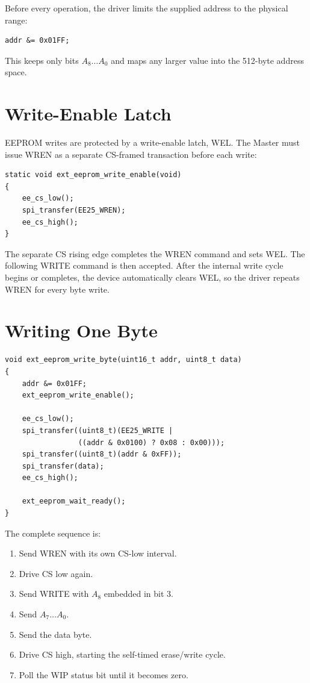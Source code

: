 \documentclass[11pt,a4paper]{article}
\begin{document}
Before every operation, the driver limits the supplied address to the physical range:
\begin{lstlisting}[style=cstyle]
addr &= 0x01FF;
\end{lstlisting}
This keeps only bits $A_8\ldots A_0$ and maps any larger value into the 512-byte address space.

\section{Write-Enable Latch}
EEPROM writes are protected by a write-enable latch, WEL. The Master must issue WREN as a separate CS-framed transaction before each write:

\begin{lstlisting}[style=cstyle]
static void ext_eeprom_write_enable(void)
{
    ee_cs_low();
    spi_transfer(EE25_WREN);
    ee_cs_high();
}
\end{lstlisting}

The separate CS rising edge completes the WREN command and sets WEL. The following WRITE command is then accepted. After the internal write cycle begins or completes, the device automatically clears WEL, so the driver repeats WREN for every byte write.

\section{Writing One Byte}

\begin{lstlisting}[style=cstyle,caption={Single-byte write sequence.}]
void ext_eeprom_write_byte(uint16_t addr, uint8_t data)
{
    addr &= 0x01FF;
    ext_eeprom_write_enable();

    ee_cs_low();
    spi_transfer((uint8_t)(EE25_WRITE |
                 ((addr & 0x0100) ? 0x08 : 0x00)));
    spi_transfer((uint8_t)(addr & 0xFF));
    spi_transfer(data);
    ee_cs_high();

    ext_eeprom_wait_ready();
}
\end{lstlisting}

The complete sequence is:
\begin{enumerate}
  \item Send WREN with its own CS-low interval.
  \item Drive CS low again.
  \item Send WRITE with $A_8$ embedded in bit 3.
  \item Send $A_7\ldots A_0$.
  \item Send the data byte.
  \item Drive CS high, starting the self-timed erase/write cycle.
  \item Poll the WIP status bit until it becomes zero.
\end{enumerate}
\end{document}
